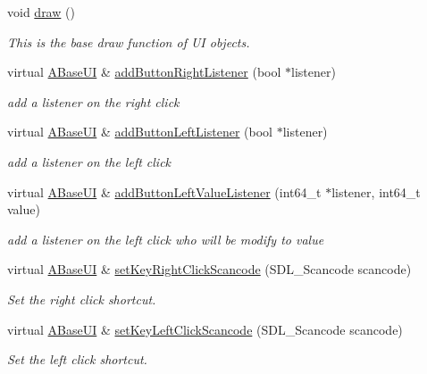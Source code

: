 \begin{DoxyCompactItemize}
\mbox{\label{class_a_base_u_i_ab8be8a69c8d5db4727921869dc942c7f}} 
void \hyperlink{class_a_base_u_i_ab8be8a69c8d5db4727921869dc942c7f}{draw} ()
\begin{DoxyCompactList}\small\item\em This is the base draw function of UI objects. \end{DoxyCompactList}\item 
virtual \hyperlink{class_a_base_u_i}{A\+Base\+UI} \& \hyperlink{class_a_base_u_i_a63ab2419d2aa942726854770a54ca15f}{add\+Button\+Right\+Listener} (bool $\ast$listener)
\begin{DoxyCompactList}\small\item\em add a listener on the right click \end{DoxyCompactList}\item 
virtual \hyperlink{class_a_base_u_i}{A\+Base\+UI} \& \hyperlink{class_a_base_u_i_a99d5577cc79031a9711196bf4f583a91}{add\+Button\+Left\+Listener} (bool $\ast$listener)
\begin{DoxyCompactList}\small\item\em add a listener on the left click \end{DoxyCompactList}\item 
virtual \hyperlink{class_a_base_u_i}{A\+Base\+UI} \& \hyperlink{class_a_base_u_i_a9d351ded131d2d5ef546616a166ace59}{add\+Button\+Left\+Value\+Listener} (int64\+\_\+t $\ast$listener, int64\+\_\+t value)
\begin{DoxyCompactList}\small\item\em add a listener on the left click who will be modify to value \end{DoxyCompactList}\item 
virtual \hyperlink{class_a_base_u_i}{A\+Base\+UI} \& \hyperlink{class_a_base_u_i_a2929b4cb63c16464efa957038d523c02}{set\+Key\+Right\+Click\+Scancode} (S\+D\+L\+\_\+\+Scancode scancode)
\begin{DoxyCompactList}\small\item\em Set the right click shortcut. \end{DoxyCompactList}\item 
virtual \hyperlink{class_a_base_u_i}{A\+Base\+UI} \& \hyperlink{class_a_base_u_i_aba668d6b9c8bf7e1e0b94dfb0b6aaab1}{set\+Key\+Left\+Click\+Scancode} (S\+D\+L\+\_\+\+Scancode scancode)
\begin{DoxyCompactList}\small\item\em Set the left click shortcut. \end{DoxyCompactList}\item 

\end{DoxyCompactItemize}
